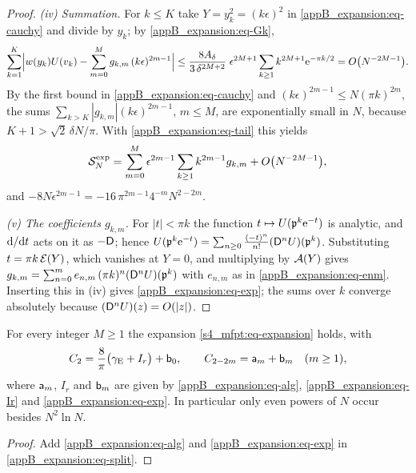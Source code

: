 \begin{proof}
\emph{(iv) Summation.} For $k\le K$ take $Y=y_k^{2}=(k\epsilon)^{2}$ in \eqref{appB_expansion:eq-cauchy} and divide by
$y_k$; by \eqref{appB_expansion:eq-Gk},
\begin{equation*}
  \sum_{k=1}^{K}\Bigl|w(y_k)U(v_k)-\sum_{m=0}^{M}g_{k,m}\,(k\epsilon)^{2m-1}\Bigr|
  \le\frac{8A_\delta}{3\,\delta^{2M+2}}\;\epsilon^{2M+1}\sum_{k\ge1}k^{2M+1}\mathrm{e}^{-\pi k/2}=O\bigl(N^{-2M-1}\bigr).
\end{equation*}
By the first bound in \eqref{appB_expansion:eq-cauchy} and $(k\epsilon)^{2m-1}\le N(\pi k)^{2m}$, the sums
$\sum_{k>K}|g_{k,m}|(k\epsilon)^{2m-1}$, $m\le M$, are exponentially small in $N$, because $K+1>\sqrt2\,\delta N/\pi$.
With \eqref{appB_expansion:eq-tail} this yields
\begin{equation*}
  \mathcal S^{\mathrm{exp}}_N=\sum_{m=0}^{M}\epsilon^{2m-1}\sum_{k\ge1}k^{2m-1}g_{k,m}+O\bigl(N^{-2M-1}\bigr),
\end{equation*}
and $-8N\epsilon^{2m-1}=-16\,\pi^{2m-1}4^{-m}N^{2-2m}$.

\emph{(v) The coefficients $g_{k,m}$.} For $|t|<\pi k$ the function $t\mapsto U(\mathfrak{p}^{k}\mathrm{e}^{-t})$ is analytic,
and $\mathrm{d}/\mathrm{d} t$ acts on it as $-\mathsf{D}$; hence $U(\mathfrak{p}^{k}\mathrm{e}^{-t})=\sum_{n\ge0}\frac{(-t)^{n}}{n!}(\mathsf{D}^{n}U)(\mathfrak{p}^{k})$.
Substituting $t=\pi k\,\mathcal{E}(Y)$, which vanishes at $Y=0$, and multiplying by $\mathcal{A}(Y)$ gives
$g_{k,m}=\sum_{n=0}^{m}e_{n,m}\,(\pi k)^{n}(\mathsf{D}^{n}U)(\mathfrak{p}^{k})$ with $e_{n,m}$ as in \eqref{appB_expansion:eq-enm}.
Inserting this in (iv) gives \eqref{appB_expansion:eq-exp}; the sums over $k$ converge absolutely because
$(\mathsf{D}^{n}U)(z)=O(|z|)$.
\end{proof}

\begin{proposition}\label{appB_expansion:prop-form}
For every integer $M\ge1$ the expansion \eqref{s4_mfpt:eq-expansion} holds, with
\begin{equation}\label{appB_expansion:eq-general}
  C_{2}=\frac8\pi\bigl(\gamma_{\mathrm{E}}+I_r\bigr)+\mathsf{b}_0,\qquad C_{2-2m}=\mathsf{a}_m+\mathsf{b}_m\quad(m\ge1),
\end{equation}
where $\mathsf{a}_m$, $I_r$ and $\mathsf{b}_m$ are given by \eqref{appB_expansion:eq-alg}, \eqref{appB_expansion:eq-Ir} and
\eqref{appB_expansion:eq-exp}. In particular only even powers of $N$ occur besides $N^{2}\ln N$.
\end{proposition}

\begin{proof}
Add \eqref{appB_expansion:eq-alg} and \eqref{appB_expansion:eq-exp} in \eqref{appB_expansion:eq-split}.
\end{proof}

